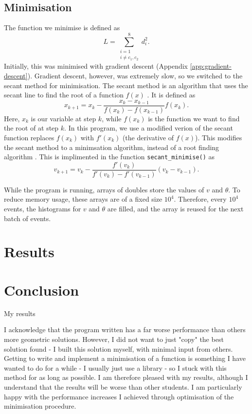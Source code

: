 \documentclass[11pt]{article}
\begin{document}
\subsection{Minimisation}
\label{sec:minimisation}
The function we minimise is defined as
\begin{equation}
    L = \sum\limits_{\substack{i=1 \\ i\neq c_1, c_2}}^{8} d_i^2.
    \label{eq:loss}
\end{equation}
Initially, this was minimised with gradient descent (Appendix \ref{app:gradient-descent}). Gradient descent, however, was extremely slow, so we switched to the secant method for minimisation. The secant method is an algorithm that uses the secant line to find the root of a function $f(x)$ \cite{secant-history}. It is defined as 
\begin{equation}
    x_{k+1} = x_k - \frac{x_k - x_{k-1}}{f(x_k)-f(x_{k-1})} f(x_k).
    \label{eq:secant}
\end{equation}
Here, $x_k$ is our variable at step $k$, while $f(x_k)$ is the function we want to find the root of at step $k$. In this program, we use a modified verion of the secant function replaces $f(x_k)$ with $f'(x_k)$ (the derivative of $f(x)$). This modifies the secant method to a minimsation algorithm, instead of a root finding algorithm \cite{secant-minimsation}. This is implimented in the function \texttt{secant\_minimise()} as
\begin{equation}
    v_{k+1} = v_k - \frac{f'(v_k)}{f'(v_k) - f'(v_{k-1})}(v_k - v_{k-1}).
\end{equation}

While the program is running, arrays of doubles store the values of $v$ and $\theta$. To reduce memory usage, these arrays are of a fixed size $10^4$. Therefore, every $10^4$ events, the histograms for $v$ and $\theta$ are filled, and the array is reused for the next batch of events.

\section{Results}
\label{sec:results}


\section{Conclusion}
\label{sec:conclusion}
My results

I acknowledge that the program written has a far worse performance than others more geometric solutions. However, I did not want to just "copy" the best solution found - I built this solution myself, with minimal input from others. Getting to write and implement a minimisation of a function is something I have wanted to do for a while - I usually just use a library - so I stuck with this method for as long as possible. I am therefore pleased with my results, although I understand that the results will be worse than other students. I am particularly happy with the performance increases I achieved through optimisation of the minimisation procedure.
\end{document}
